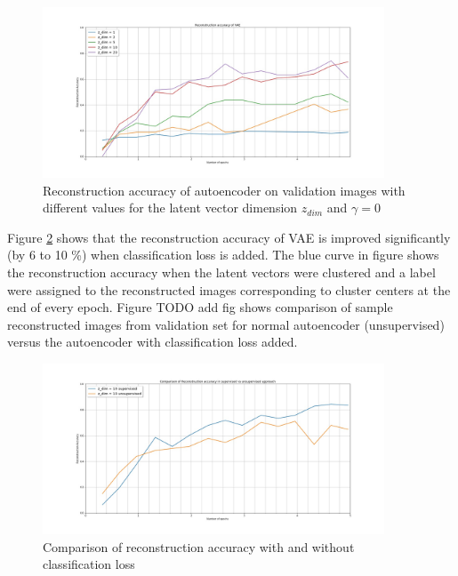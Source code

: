\documentclass{uai2021} %
\begin{document}
\begin{figure}[!t]
\centering
\includegraphics[width=4in]{reconstruction_accuracy.jpg}
\caption{Reconstruction accuracy of autoencoder on validation images with different values for the latent vector dimension  $z_{dim}$ and $\gamma = 0$}
\label{reconstruction_accuracy}
\end{figure}

Figure \ref{reconstruction_accuracy_sup_vs_unsup} shows that the reconstruction accuracy of VAE is improved significantly  (by 6 to 10 \%) when classification loss is added. The blue curve in figure shows the reconstruction accuracy when the latent vectors were clustered and a label were assigned to the reconstructed images corresponding to  cluster centers at the end of every epoch. Figure TODO add fig shows comparison of sample reconstructed images from validation set for normal autoencoder (unsupervised) versus the autoencoder with classification loss added.

\begin{figure}[!t]
\centering
\includegraphics[width=4in]{reconstruction_accuracy_compare_supervised_vs_unsuprevised.jpg}
\caption{Comparison of reconstruction accuracy with and without classification loss }
\label{reconstruction_accuracy_sup_vs_unsup}
\end{figure}
\end{document}

